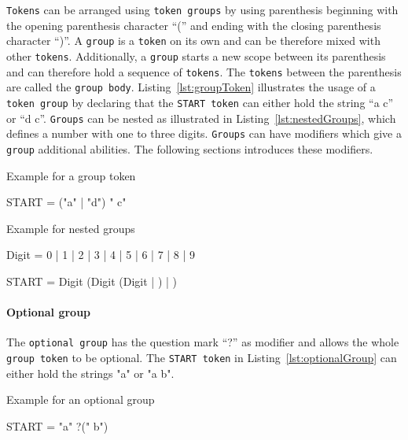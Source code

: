 \texttt{Tokens} can be arranged using \texttt{token groups} by using parenthesis beginning with the opening parenthesis character \enquote{(} and ending with the closing parenthesis character \enquote{)}. A \texttt{group} is a \texttt{token} on its own and can be therefore mixed with other \texttt{tokens}. Additionally, a \texttt{group} starts a new scope between its parenthesis and can therefore hold a sequence of \texttt{tokens}. The \texttt{tokens} between the parenthesis are called the \texttt{group body}. Listing~\ref{lst:groupToken} illustrates the usage of a \texttt{token group} by declaring that the \texttt{START token} can either hold the string \enquote{a c} or \enquote{d c}. \texttt{Groups} can be nested as illustrated in Listing~\ref{lst:nestedGroups}, which defines a number with one to three digits. \texttt{Groups} can have modifiers which give a \texttt{group} additional abilities. The following sections introduces these modifiers.

\begin{listing}
\caption{Example for a group token}
\label{lst:groupToken}
\begin{gocode}
START = ("a" | "d") " c"
\end{gocode}
\end{listing}

\begin{listing}
\caption{Example for nested groups}
\label{lst:nestedGroups}
\begin{gocode}
Digit = 0 | 1 | 2 | 3 | 4 | 5 | 6 | 7 | 8 | 9

START = Digit (Digit (Digit | ) | )
\end{gocode}
\end{listing}

\paragraph{Optional group}
\label{subsec:groupOptional}

The \texttt{optional group} has the question mark \enquote{?} as modifier and allows the whole \texttt{group token} to be optional. The \texttt{START token} in Listing~\ref{lst:optionalGroup} can either hold the strings "a" or "a b".

\begin{listing}
\caption{Example for an optional group}
\label{lst:optionalGroup}
\begin{gocode}
START = "a" ?(" b")
\end{gocode}
\end{listing}

